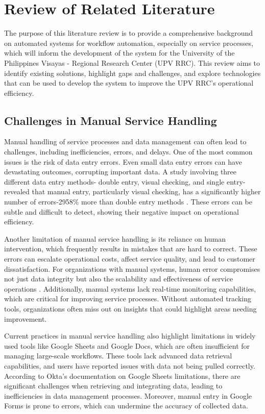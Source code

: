 \chapter{Review of Related Literature}
\label{sec:relatedlit}

The purpose of this literature review is to provide a comprehensive background on automated systems for workflow automation, especially on service processes, which will inform the development of the system for the University of the Philippines Visayas - Regional Research Center (UPV RRC). This review aims to identify existing solutions, highlight gaps and challenges, and explore technologies that can be used to develop the system to improve the UPV RRC’s operational efficiency.

\section{Challenges in Manual Service Handling}

Manual handling of service processes and data management can often lead to challenges, including inefficiencies, errors, and delays. One of the most common issues is the risk of data entry errors. Even small data entry errors can have devastating outcomes, corrupting important data. A study involving three different data entry methods- double entry, visual checking, and single entry- revealed that manual entry, particularly visual checking, has a significantly higher number of errors-2958\% more than double entry methods \cite{barchard2011}. These errors can be subtle and difficult to detect, showing their negative impact on operational efficiency. 

Another limitation of manual service handling is its reliance on human intervention, which frequently results in mistakes that are hard to correct. These errors can escalate operational costs, affect service quality, and lead to customer dissatisfaction. For organizations with manual systems, human error compromises not just data integrity but also the scalability and effectiveness of service operations \cite{bitcat2023}. Additionally, manual systems lack real-time monitoring capabilities, which are critical for improving service processes. Without automated tracking tools, organizations often miss out on insights that could highlight areas needing improvement.

Current practices in manual service handling also highlight limitations in widely used tools like Google Sheets and Google Docs, which are often insufficient for managing large-scale workflows. These tools lack advanced data retrieval capabilities, and users have reported issues with data not being pulled correctly. According to Okta’s documentation on Google Sheets limitations, there are significant challenges when retrieving and integrating data, leading to inefficiencies in data management processes. Moreover, manual entry in Google Forms is prone to errors, which can undermine the accuracy of collected data.


